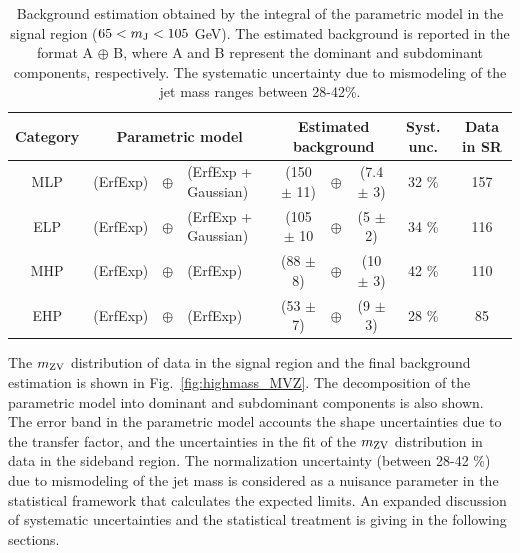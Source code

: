 \begin{landscape}
\begin{table}[p]
\begin{center}
\caption[Background estimation]{Background estimation obtained by the integral of the parametric model in the signal region ($65 < m_\mathrm{J} < 105$ GeV). The estimated background is reported in the format A $\oplus$ B, where A  and B represent the dominant and subdominant components, respectively. The systematic uncertainty due to mismodeling of the jet mass ranges between 28-42\%.}
\label{tab:bkgnormal}
\begin{tabular}{ c  ccl  ccc  c  c }
\hline
Category & \multicolumn{3}{c}{Parametric model}      &\multicolumn{3}{c}{Estimated background} & Syst. unc.      & Data in SR \\ \hline\hline 
   MLP     &   (ErfExp)  & $\oplus$ & (ErfExp + Gaussian)     &(150 $\pm$ 11) & $\oplus$ & (7.4 $\pm$ 3)            &          32 \%                &  157                \\ 
   ELP     &    (ErfExp)  & $\oplus$ & (ErfExp + Gaussian)    &(105 $\pm$ 10   & $\oplus$ & (5   $\pm$ 2)              &          34 \%                & 116                \\ 
   MHP     &   (ErfExp)  & $\oplus$ & (ErfExp)                       &(88 $\pm$ 8)     &$\oplus$  & (10 $\pm$ 3)               &          42 \%                & 110                \\ 
   EHP     &    (ErfExp)  & $\oplus$ & (ErfExp)                       &(53 $\pm$ 7)    & $\oplus$  & (9 $\pm$ 3)                 &          28 \%                & 85                  \\ \hline
\end{tabular}
\end{center}
\end{table}
\end{landscape}

\clearpage

The $m_\mathrm{ZV}$ distribution of data in the signal region and the final background estimation is shown in Fig.~\ref{fig:highmass_MVZ}. The decomposition of the parametric model into dominant and subdominant components is also shown. The error band in the parametric model accounts the shape uncertainties due to the transfer factor, and the uncertainties in the fit of the $m_\mathrm{ZV}$ distribution in data in the sideband region. The normalization uncertainty (between 28-42 \%) due to mismodeling of the jet mass is considered as a nuisance parameter in the statistical framework that calculates the expected limits. An expanded discussion of systematic uncertainties and the statistical treatment is giving in the following sections.

